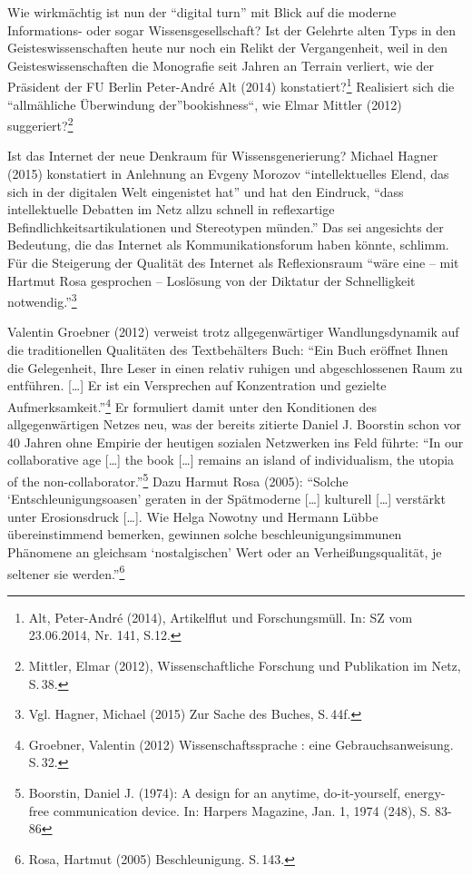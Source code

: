 \documentclass[a4paper,
fontsize=11pt,
oneside,
numbers=noperiodatend,
parskip=half-,
bibliography=totoc,
final
]{scrartcl}
\begin{document}
Wie wirkmächtig ist nun der \enquote{digital turn} mit Blick auf die
moderne Informations- oder sogar Wissensgesellschaft? Ist der Gelehrte
alten Typs in den Geisteswissenschaften heute nur noch ein Relikt der
Vergangenheit, weil in den Geisteswissenschaften die Monografie seit
Jahren an Terrain verliert, wie der Präsident der FU Berlin Peter-André
Alt (2014) konstatiert?\footnote{Alt, Peter-André (2014), Artikelflut
  und Forschungsmüll. In: SZ vom 23.06.2014, Nr. 141, S.12.} Realisiert
sich die \enquote{allmähliche Überwindung der}bookishness``, wie Elmar
Mittler (2012) suggeriert?\footnote{Mittler, Elmar (2012),
  Wissenschaftliche Forschung und Publikation im Netz, S.\,38.}

Ist das Internet der neue Denkraum für Wissensgenerierung? Michael
Hagner (2015) konstatiert in Anlehnung an Evgeny Morozov
\enquote{intellektuelles Elend, das sich in der digitalen Welt
eingenistet hat} und hat den Eindruck, \enquote{dass intellektuelle
Debatten im Netz allzu schnell in reflexartige
Befindlichkeitsartikulationen und Stereotypen münden.} Das sei
angesichts der Bedeutung, die das Internet als Kommunikationsforum haben
könnte, schlimm. Für die Steigerung der Qualität des Internet als
Reflexionsraum \enquote{wäre eine -- mit Hartmut Rosa gesprochen --
Loslösung von der Diktatur der Schnelligkeit notwendig.}\footnote{Vgl.
  Hagner, Michael (2015) Zur Sache des Buches, S.\,44f.}

Valentin Groebner (2012) verweist trotz allgegenwärtiger
Wandlungsdynamik auf die traditionellen Qualitäten des Textbehälters
Buch: \enquote{Ein Buch eröffnet Ihnen die Gelegenheit, Ihre Leser in
einen relativ ruhigen und abgeschlossenen Raum zu entführen.
{[}\ldots{}{]} Er ist ein Versprechen auf Konzentration und gezielte
Aufmerksamkeit.}\footnote{Groebner, Valentin (2012) Wissenschaftssprache
  : eine Gebrauchsanweisung. S.\,32.} Er formuliert damit unter den
Konditionen des allgegenwärtigen Netzes neu, was der bereits zitierte
Daniel J. Boorstin schon vor 40 Jahren ohne Empirie der heutigen
sozialen Netzwerken ins Feld führte: \enquote{In our collaborative age
{[}\ldots{}{]} the book {[}\ldots{}{]} remains an island of
individualism, the utopia of the non-collaborator.}\footnote{Boorstin,
  Daniel J. (1974): A design for an anytime, do-it-yourself, energy-free
  communication device. In: Harpers Magazine, Jan. 1, 1974 (248), S.
  83-86} Dazu Harmut Rosa (2005): \enquote{Solche
\enquote{Entschleunigungsoasen} geraten in der Spätmoderne
{[}\ldots{}{]} kulturell {[}\ldots{}{]} verstärkt unter Erosionsdruck
{[}\ldots{}{]}. Wie Helga Nowotny und Hermann Lübbe übereinstimmend
bemerken, gewinnen solche beschleunigungsimmunen Phänomene an gleichsam
\enquote{nostalgischen} Wert oder an Verheißungsqualität, je seltener
sie werden.}\footnote{Rosa, Hartmut (2005) Beschleunigung. S.\,143.}
\end{document}
